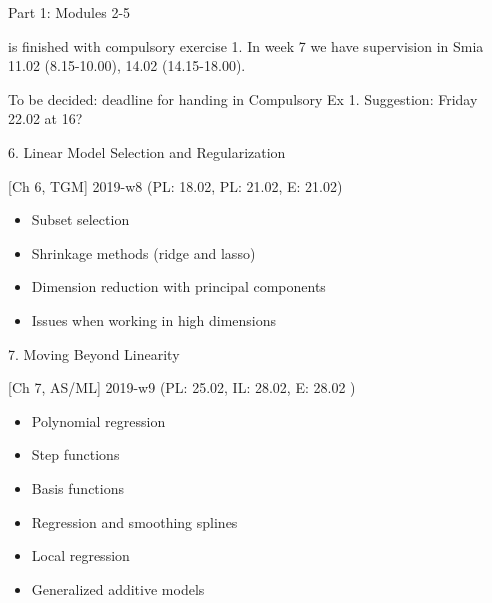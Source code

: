 \documentclass[10pt,ignorenonframetext,]{beamer}
\providecommand{\tightlist}{%
  \setlength{\itemsep}{0pt}\setlength{\parskip}{0pt}}
\begin{document}
\begin{frame}

\begin{block}{Part 1: Modules 2-5}

is finished with compulsory exercise 1. In week 7 we have supervision in
Smia 11.02 (8.15-10.00), 14.02 (14.15-18.00).

To be decided: deadline for handing in Compulsory Ex 1. Suggestion:
Friday 22.02 at 16?

\end{block}

\end{frame}

\begin{frame}

\begin{block}{6. Linear Model Selection and Regularization}

{[}Ch 6, TGM{]} 2019-w8 (PL: 18.02, PL: 21.02, E: 21.02)

\begin{itemize}
\tightlist
\item
  Subset selection
\item
  Shrinkage methods (ridge and lasso)
\item
  Dimension reduction with principal components
\item
  Issues when working in high dimensions
\end{itemize}

\end{block}

\end{frame}

\begin{frame}

\begin{block}{7. Moving Beyond Linearity}

{[}Ch 7, AS/ML{]} 2019-w9 (PL: 25.02, IL: 28.02, E: 28.02 )

\begin{itemize}
\tightlist
\item
  Polynomial regression
\item
  Step functions
\item
  Basis functions
\item
  Regression and smoothing splines
\item
  Local regression
\item
  Generalized additive models
\end{itemize}

\end{block}

\end{frame}
\end{document}
